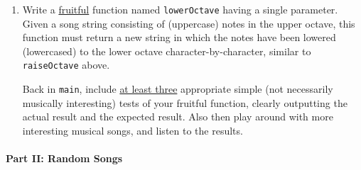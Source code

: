 \documentclass[10pt]{article}
\newcommand{\blk}{\color{black}}
\newcommand{\red}{\color{red}}
\begin{document}
\begin{enumerate}
        \vspace*{6pt}
        Use the algorithm from class to build a new song string from scratch:
        iterate through the given song note-by-note, and append to your new
        string an uppercased version of each note, returning the upper-octave
        string at the end.
        Note that, inside your for-loop, an expression like that shown below
        will do the right thing to uppercase the ith note in a song:
\begin{Verbatim}[commandchars=\\\{\}]
    song[i].upper()  \red# convert the note at index i to uppercase\blk
\end{Verbatim}
        {\bf IMPORTANT:} What is shown above is an expression only.
        Remember to append the result of that expression to your new string.
        Also, for this task, you must use {\tt upper()} on each character,
        \uline{not} on the entire provided song string.

        \vspace*{6pt}
        Back in {\tt main}, include \uline{at least three} appropriate simple
        (not necessarily musically interesting) tests of your fruitful
        function, clearly outputting the actual result and the expected result.  
        Also then play around with more interesting musical songs, and
        listen to the results.

    \item Write a \uline{fruitful} function named {\tt lowerOctave} having a
        single parameter.
        Given a song string consisting of (uppercase) notes in the upper octave,
        this function must return a new string in which the notes have been
        lowered (lowercased) to the lower octave character-by-character,
        similar to {\tt raiseOctave} above.

        \vspace*{6pt}
        Back in {\tt main}, include \uline{at least three} appropriate simple
        (not necessarily musically interesting) tests of your fruitful
        function, clearly outputting the actual result and the expected result.  
        Also then play around with more interesting musical songs, and
        listen to the results.
        
        
\end{enumerate}

\newpage

\paragraph{Part II: Random Songs}
\end{document}

